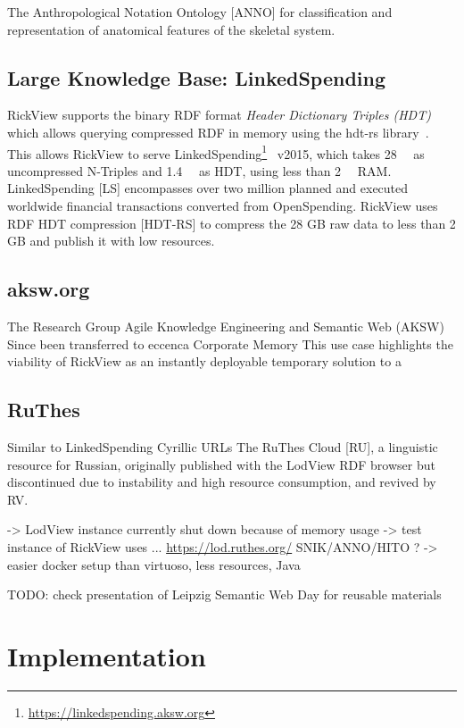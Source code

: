 \documentclass{ceurart}
\begin{document}
The Anthropological Notation Ontology [ANNO] for classification and representation of anatomical features of the skeletal system.

\subsection{Large Knowledge Base: LinkedSpending}
RickView supports the binary RDF format \emph{Header Dictionary Triples (HDT)}~\citep{hdt2012} which allows querying compressed RDF in memory using the hdt-rs library~\citep{hdtrs}.
This allows RickView to serve LinkedSpending\footnote{\url{https://linkedspending.aksw.org}}~\citep{linkedspending} v2015, which takes \SI{28}{\giga\byte} as uncompressed N-Triples and \SI{1.4}{\giga\byte} as HDT, using less than \SI{2}{\giga\byte} RAM.
LinkedSpending [LS] encompasses over two million planned and executed worldwide financial transactions converted from OpenSpending. RickView uses RDF HDT compression [HDT-RS] to compress the 28 GB raw data to less than 2 GB and publish it with low resources.

\citep{linkedspending}
\citep{hdt}

\subsection{aksw.org}
The Research Group Agile Knowledge Engineering and Semantic Web (AKSW)
Since been transferred to eccenca Corporate Memory
This use case highlights the viability of RickView as an instantly deployable temporary solution to a


\subsection{RuThes}
\citep{ruthes}
Similar to LinkedSpending
Cyrillic URLs
The RuThes Cloud [RU], a linguistic resource for Russian, originally published with the LodView RDF browser but discontinued due to instability and high resource consumption, and revived by RV.

-> LodView instance currently shut down because of memory usage
-> test instance of RickView uses ...
\url{https://lod.ruthes.org/}
SNIK/ANNO/HITO ?
-> easier docker setup than virtuoso, less resources, Java



TODO: check presentation of Leipzig Semantic Web Day for reusable materials

\section{Implementation}\label{implementation}
\end{document}
